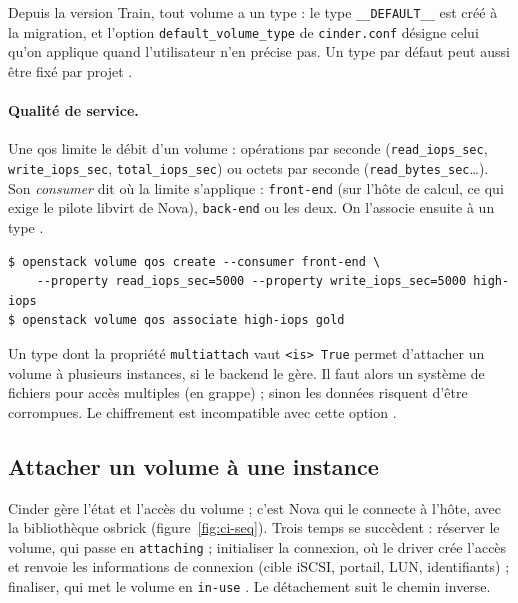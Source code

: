 Depuis la version Train, tout volume a un type : le type \texttt{\_\_DEFAULT\_\_} est créé à la migration, et l'option
\texttt{default\_\allowbreak volume\_\allowbreak type} de \texttt{cinder.conf} désigne celui qu'on applique quand l'utilisateur n'en
précise pas. Un type par défaut peut aussi être fixé par projet \parencite{cinder-default-types}.

\paragraph{Qualité de service.} Une \gls{qos} limite le débit d'un volume : opérations par seconde (\texttt{read\_iops\_sec},
\texttt{write\_iops\_sec}, \texttt{total\_iops\_sec}) ou octets par seconde (\texttt{read\_bytes\_sec}\dots). Son
\emph{consumer} dit où la limite s'applique : \texttt{front-end} (sur l'hôte de calcul, ce qui exige le pilote libvirt de Nova),
\texttt{back-end} ou les deux. On l'associe ensuite à un type \parencite{cinder-qos}.

\par\noindent\begin{minipage}{\linewidth}
\begin{lstlisting}[style=terminal]
$ openstack volume qos create --consumer front-end \
    --property read_iops_sec=5000 --property write_iops_sec=5000 high-iops
$ openstack volume qos associate high-iops gold
\end{lstlisting}
\end{minipage}\par

\begin{remarque}
Un type dont la propriété \texttt{multiattach} vaut \texttt{<is> True} permet d'attacher un volume à plusieurs instances,
si le backend le gère. Il faut alors un système de fichiers pour accès multiples (en grappe) ; sinon les données risquent
d'être corrompues. Le chiffrement est incompatible avec cette option \parencite{cinder-multiattach}.
\end{remarque}

\subsection{Attacher un volume à une instance}\label{sec:ci-attache}

Cinder gère l'état et l'accès du volume ; c'est Nova qui le connecte à l'hôte, avec la bibliothèque \gls{osbrick}
(figure~\ref{fig:ci-seq}). Trois temps se succèdent : réserver le volume, qui passe en \texttt{attaching} ;
initialiser la connexion, où le driver crée l'accès et renvoie les informations de connexion (cible iSCSI, portail,
LUN, identifiants) ; finaliser, qui met le volume en \texttt{in-use} \parencite{cinder-attach}. Le détachement suit le chemin
inverse.

